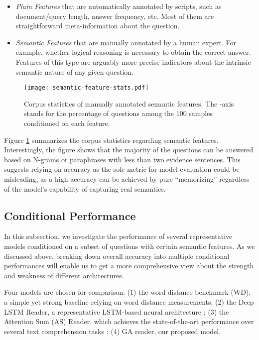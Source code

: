 \documentclass[11pt,a4paper]{article}
\begin{document}
\begin{itemize}
\item \emph{Plain Features} that are automatically annotated by scripts, such as document/query length, answer frequency, etc. Most of them are straightforward meta-information about the question.
\item \emph{Semantic Features} that are manually annotated by a human expert. For example, whether logical reasoning is necessary to obtain the correct answer. Features of this type are arguably more precise indicators about the intrinsic semantic nature of any given question.
\end{itemize}

\begin{figure}[t]
\centering
\texttt{[image: semantic-feature-stats.pdf]}
\caption{Corpus statistics of manually annotated semantic features.
The -axis stands for the percentage of questions among the 100 samples conditioned on each feature.}
\label{fig:sf-stats}
\end{figure}

Figure \ref{fig:sf-stats} summarizes the corpus statistics regarding semantic features. Interestingly, the figure shows that the majority of the questions can be answered based on N-grams or paraphrases with less than two evidence sentences. This suggests relying on accuracy as the sole metric for model evaluation could be misleading, as a high accuracy can be achieved by pure ``memorizing'' regardless of the model's capability of capturing real semantics.

\subsection{Conditional Performance}
In this subsection, we investigate the performance of several representative models conditioned on a subset of questions with certain semantic features. As we discussed above, breaking down overall accuracy into multiple conditional performances will enable us to get a more comprehensive view about the strength and weakness of different architectures.

Four models are chosen for comparison: (1) the word distance benchmark (WD), a simple yet strong baseline relying on word distance measurements; (2) the Deep LSTM Reader, a representative LSTM-based neural architecture
\citep{hermann2015teaching}; (3) the Attention Sum (AS) Reader, which achieves the state-of-the-art performance over several text comprehension tasks \citep{kadlec2016text}; (4) GA reader, our proposed model.
\end{document}
